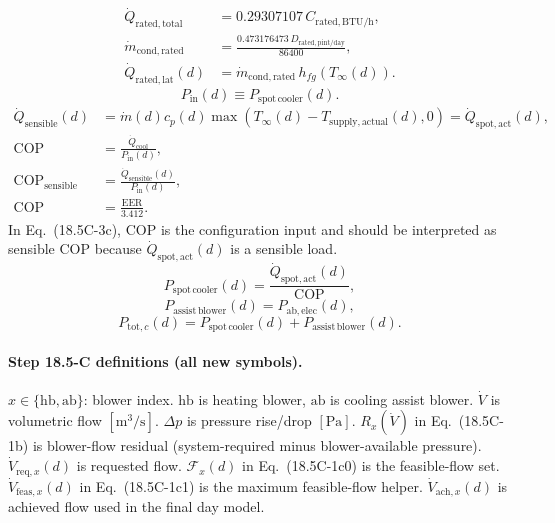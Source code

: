 \documentclass[11pt]{article}
\begin{document}
\begin{equation}
\begin{aligned}
\dot Q_{\mathrm{rated,total}}&=0.29307107\,C_{\mathrm{rated,BTU/h}},\\
\dot m_{\mathrm{cond,rated}}&=\frac{0.473176473\,D_{\mathrm{rated,pint/day}}}{86400},\\
\dot Q_{\mathrm{rated,lat}}(d)&=\dot m_{\mathrm{cond,rated}}\,h_{fg}(T_\infty(d)).
\end{aligned}
\tag{18.5C-3b2}
\end{equation}
\begin{equation}
P_{\mathrm{in}}(d)\equiv P_{\mathrm{spot\,cooler}}(d).
\tag{18.5C-3c00}
\end{equation}
\begin{equation}
\begin{aligned}
\dot Q_{\mathrm{sensible}}(d)&=
\dot m(d)c_p(d)\max\!\left(T_\infty(d)-T_{\mathrm{supply,actual}}(d),0\right)
=\dot Q_{\mathrm{spot,act}}(d),\\
\mathrm{COP}&=\frac{\dot Q_{\mathrm{cool}}}{P_{\mathrm{in}}(d)},\\
\mathrm{COP}_{\mathrm{sensible}}&=\frac{\dot Q_{\mathrm{sensible}}(d)}{P_{\mathrm{in}}(d)},\\
\mathrm{COP}&=\frac{\mathrm{EER}}{3.412}.
\end{aligned}
\tag{18.5C-3c0}
\end{equation}
\noindent In Eq.~(18.5C-3c), \(\mathrm{COP}\) is the configuration input and should be interpreted as sensible COP because \(\dot Q_{\mathrm{spot,act}}(d)\) is a sensible load.
\begin{equation}
P_{\mathrm{spot\,cooler}}(d)=\frac{\dot Q_{\mathrm{spot,act}}(d)}{\mathrm{COP}},
\tag{18.5C-3c}
\end{equation}
\begin{equation}
P_{\mathrm{assist\,blower}}(d)=P_{\mathrm{ab},\mathrm{elec}}(d),
\tag{18.5C-3d}
\end{equation}
\begin{equation}
P_{\mathrm{tot},c}(d)=P_{\mathrm{spot\,cooler}}(d)+P_{\mathrm{assist\,blower}}(d).
\tag{18.5C-4}
\end{equation}

\paragraph{Step 18.5-C definitions (all new symbols).}
\(x\in\{\mathrm{hb},\mathrm{ab}\}\): blower index. \(\mathrm{hb}\) is heating blower, \(\mathrm{ab}\) is cooling assist blower. \(\dot V\) is volumetric flow \([\mathrm{m^3/s}]\). \(\Delta p\) is pressure rise/drop \([\mathrm{Pa}]\). \(R_x(\dot V)\) in Eq.~(18.5C-1b) is blower-flow residual (system-required minus blower-available pressure). \(\dot V_{\mathrm{req},x}(d)\) is requested flow. \(\mathcal{F}_x(d)\) in Eq.~(18.5C-1c0) is the feasible-flow set. \(\dot V_{\mathrm{feas},x}(d)\) in Eq.~(18.5C-1c1) is the maximum feasible-flow helper. \(\dot V_{\mathrm{ach},x}(d)\) is achieved flow used in the final day model.
\end{document}
